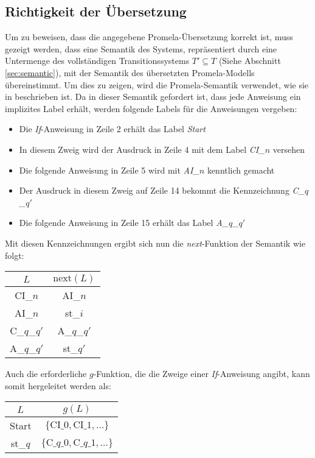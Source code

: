 \subsection{Richtigkeit der Übersetzung}
Um zu beweisen, dass die angegebene Promela-Übersetzung korrekt ist, muss gezeigt werden, dass eine Semantik des Systems, repräsentiert durch eine Untermenge des vollständigen Transitionssystems $T'\subseteq T$ (Siehe Abschnitt \ref{sec:semantic}), mit der Semantik des übersetzten Promela-Modells übereinstimmt.
Um dies zu zeigen, wird die Promela-Semantik verwendet, wie sie in \cite{Gallardo04formalaspects} beschrieben ist.
Da in dieser Semantik gefordert ist, dass jede Anweisung ein implizites Label erhält, werden folgende Labels für die Anweisungen vergeben:
\begin{itemize}
\item Die \emph{If}-Anweisung in Zeile 2 erhält das Label \emph{Start}
\item In diesem Zweig wird der Ausdruck in Zeile 4 mit dem Label \emph{CI\_$n$} versehen
\item Die folgende Anweisung in Zeile 5 wird mit \emph{AI\_$n$} kenntlich gemacht
\item Der Ausdruck in diesem Zweig auf Zeile 14 bekommt die Kennzeichnung \emph{C\_$q$\_$q'$}
\item Die folgende Anweisung in Zeile 15 erhält das Label \emph{A\_$q$\_$q'$}
\end{itemize}

Mit diesen Kennzeichnungen ergibt sich nun die \emph{next}-Funktion der Semantik wie folgt:

\begin{tabular}{|c|c|}
  \hline
  $L$ & $\textrm{next}(L)$\\
  \hline
  CI\_$n$ & AI\_$n$\\
  AI\_$n$ & st\_$i$\\
  C\_$q$\_$q'$ & A\_$q$\_$q'$\\
  A\_$q$\_$q'$ & st\_$q'$\\
  \hline
\end{tabular}

Auch die erforderliche $g$-Funktion, die die Zweige einer \emph{If}-Anweisung angibt, kann somit hergeleitet werden als:

\begin{tabular}{|c|c|}
  \hline
  $L$ & $g(L)$\\
  \hline
  Start & $\{ \textrm{CI\_}0,\textrm{CI\_}1,\dots \}$\\
  st\_$q$ & $\{ \textrm{C\_}q\textrm{\_}0,\textrm{C\_}q\textrm{\_}1,\dots \}$\\
  \hline
\end{tabular}

